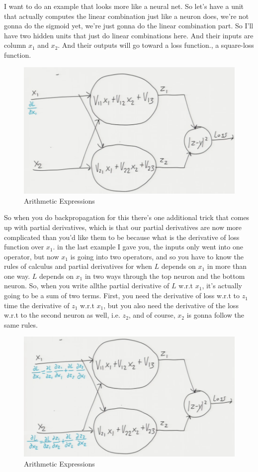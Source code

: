 \documentclass[fleqn,10pt]{olplainarticle}
\theoremstyle{definition}
\theoremstyle{remark}
\begin{document}
I want to do an example that looks more like a neural net. So let's have a unit that actually computes the linear combination just like a neuron does, we're not gonna do the sigmoid yet, we're just gonna do the linear combination part. So I'll have two hidden units that just do linear combinations here. And their inputs are column $x_1$ and $x_2$. And their outputs will go toward a loss function., a square-loss function. 
\begin{figure}[ht]
\centering
\includegraphics[width=0.7\linewidth]{images/arithmetic_expression_12}
\caption{Arithmetic Expressions}
\label{fig:arithmetic_expression_12}
\end{figure}

So when you do backpropagation for this there's one additional trick that comes up with partial derivatives, which is that our partial derivatives are now more complicated than you'd like them to be because what is the derivative of loss function over $x_1$. in the last example I gave you, the inputs only went into one operator, but now $x_1$ is going into two operators, and so you have to know the rules of calculus and partial derivatives for when $L$ depends on $x_1$ in more than one way. $L$ depends on $x_1$ in two ways through the top neuron and the bottom neuron. So, when you write allthe partial derivative of $L$ w.r.t $x_1$, it's actually going to be a sum of two terms. First, you need the derivative of loss w.r.t to $z_1$ time the derivative of $z_1$ w.r.t $x_1$, but you also need the derivative of the loss w.r.t to the second neuron as well, i.e. $z_2$, and of course, $x_2$ is gonna follow the same rules. 
\begin{figure}[ht]
\centering
\includegraphics[width=0.7\linewidth]{images/arithmetic_expression_13}
\caption{Arithmetic Expressions}
\label{fig:arithmetic_expression_13}
\end{figure}
\clearpage
\end{document}
